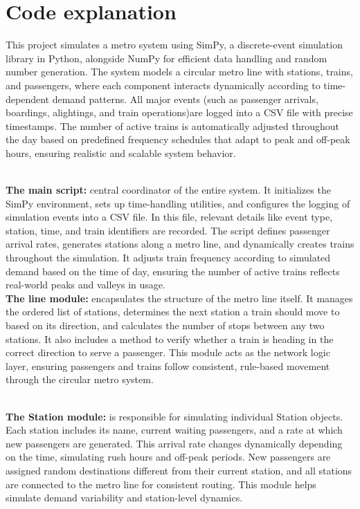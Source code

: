 
\chapter*{\center \Large  Code explanation }

This project simulates a metro system using SimPy, a discrete-event simulation library in Python, alongside NumPy for efficient data handling and random number generation. The system models a circular metro line with stations, trains, and passengers, where each component interacts dynamically according to time-dependent demand patterns. All major events (such as passenger arrivals, boardings, alightings, and train operations)are logged into a CSV file with precise timestamps. The number of active trains is automatically adjusted throughout the day based on predefined frequency schedules that adapt to peak and off-peak hours, ensuring realistic and scalable system behavior.


~\\[0,5cm]
\noindent\textbf{The main script:} central coordinator of the entire system. It initializes the SimPy environment, sets up time-handling utilities, and configures the logging of simulation events into a CSV file. In this file, relevant details like event type, station, time, and train identifiers are recorded. The script defines passenger arrival rates, generates stations along a metro line, and dynamically creates trains throughout the simulation. It adjusts train frequency according to simulated demand based on the time of day, ensuring the number of active trains reflects real-world peaks and valleys in usage.
~\\[0,5cm]
\noindent\textbf{The line module:} encapsulates the structure of the metro line itself. It manages the ordered list of stations, determines the next station a train should move to based on its direction, and calculates the number of stops between any two stations. It also includes a method to verify whether a train is heading in the correct direction to serve a passenger. This module acts as the network logic layer, ensuring passengers and trains follow consistent, rule-based movement through the circular metro system.

~\\[0,5cm]
\noindent\textbf{The Station module:} is responsible for simulating individual Station objects. Each station includes its name, current waiting passengers, and a rate at which new passengers are generated. This arrival rate changes dynamically depending on the time, simulating rush hours and off-peak periods. New passengers are assigned random destinations different from their current station, and all stations are connected to the metro line for consistent routing. This module helps simulate demand variability and station-level dynamics.

